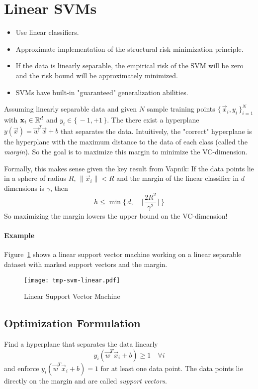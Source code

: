 	\section{Linear SVMs}
		\begin{itemize}
			\item Use linear classifiers.
			\item Approximate implementation of the structural risk minimization principle.
			\item If the data is linearly separable, the empirical risk of the SVM will be zero and the risk bound will be approximately minimized.
			\item SVMs have built-in "guaranteed" generalization abilities.
		\end{itemize}
	
		Assuming linearly separable data and given \(N\) sample training points \( \{\, \vec{x}_i, y_i \,\}_{i = 1}^N \) with \( \boldsymbol{\mathrm{x}}_i \in \mathbb{R}^d \) and \( y_i \in \{\, -1, +1 \,\} \). The there exist a hyperplane \( y(\vec{x}) = \vec{w}^T \vec{x} + b \) that separates the data. Intuitively, the "correct" hyperplane is the hyperplane with the maximum distance to the data of each class (called the \emph{margin}). So the goal is to maximize this margin to minimize the VC-dimension.
		
		Formally, this makes sense given the key result from Vapnik: If the data points lie in a sphere of radius \(R\), \( \lVert \vec{x}_i \rVert < R \) and the margin of the linear classifier in \(d\) dimensions is \(\gamma\), then
		\begin{equation}
			h \leq \min\Bigg\{\, d, \quad \bigg\lceil \frac{2R^2}{\gamma^2} \bigg\rceil \,\Bigg\}
		\end{equation}
		So maximizing the margin lowers the upper bound on the VC-dimension!
		
		\paragraph{Example}
			Figure~\ref{fig:svm} shows a linear support vector machine working on a linear separable dataset with marked support vectors and the margin.
			
			\begin{figure}
				\centering
				\texttt{[image: tmp-svm-linear.pdf]}
				\caption{Linear Support Vector Machine}
				\label{fig:svm}
			\end{figure}

		\subsection{Optimization Formulation}
			Find a hyperplane that separates the data linearly
			\begin{equation}
				y_i (\vec{w}^T \vec{x}_i + b) \geq 1 \quad\forall i
			\end{equation}
			and enforce \( y_i (\vec{w}^T \vec{x}_i + b) = 1 \) for at least one data point. The data points lie directly on the margin and are called \emph{support vectors}.
			
